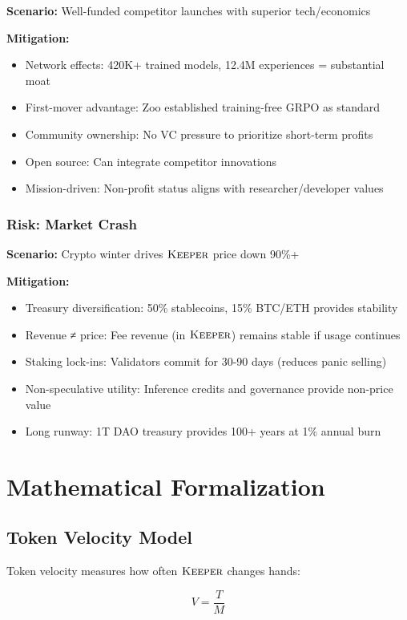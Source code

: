 \documentclass[11pt,letterpaper]{article}
\theoremstyle{definition}
\theoremstyle{remark}
\newcommand{\KEEPER}{\textsc{Keeper}}
\begin{document}
\textbf{Scenario:} Well-funded competitor launches with superior tech/economics

\textbf{Mitigation:}
\begin{itemize}
\item Network effects: 420K+ trained models, 12.4M experiences = substantial moat
\item First-mover advantage: Zoo established training-free GRPO as standard
\item Community ownership: No VC pressure to prioritize short-term profits
\item Open source: Can integrate competitor innovations
\item Mission-driven: Non-profit status aligns with researcher/developer values
\end{itemize}

\subsubsection{Risk: Market Crash}

\textbf{Scenario:} Crypto winter drives $\KEEPER$ price down 90\%+

\textbf{Mitigation:}
\begin{itemize}
\item Treasury diversification: 50\% stablecoins, 15\% BTC/ETH provides stability
\item Revenue ≠ price: Fee revenue (in $\KEEPER$) remains stable if usage continues
\item Staking lock-ins: Validators commit for 30-90 days (reduces panic selling)
\item Non-speculative utility: Inference credits and governance provide non-price value
\item Long runway: 1T DAO treasury provides 100+ years at 1\% annual burn
\end{itemize}

\section{Mathematical Formalization}

\subsection{Token Velocity Model}

Token velocity measures how often $\KEEPER$ changes hands:

\begin{equation}
V = \frac{T}{M}
\end{equation}
\end{document}
